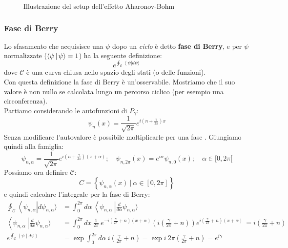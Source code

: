 \documentclass[../../FisicaTeorica.tex]{subfiles}
\begin{document}
\begin{figure}

    \caption{Illustrazione del setup dell'effetto Aharonov-Bohm}
    \label{fig:aharonov_bohm}
\end{figure}%

\subsubsection{Fase di Berry}
Lo sfasamento che acquisisce una $\psi$ dopo un \textit{ciclo} è detto \textbf{fase di Berry}, e per $\psi$ normalizzate ($\Braket{\psi|\psi} = 1$) ha la seguente definizione:
\[
e^{\oint_{\mathcal{C}}{\left\langle\psi\right|d\psi\rangle\ }}
\]
dove $\mathcal{C}$ è una curva chiusa nello spazio degli stati (o delle funzioni).\\
Con questa definizione la fase di Berry è un'osservabile. Mostriamo che il suo valore è non nullo se calcolata lungo un percorso ciclico (per esempio una circonferenza).\\
Partiamo considerando le autofunzioni di $P_\gamma$:
\[
\psi_n\left(x\right)=\frac{1}{\sqrt{2\pi}}e^{i\left(n+\frac{\gamma}{2\pi}\right)x}
\]
Senza modificare l'autovalore è possibile moltiplicarle per una fase .
Giungiamo quindi alla famiglia:
\[
\psi_{n,\alpha}=\frac{1}{\sqrt{2\pi}}e^{i\left(n+\frac{\gamma}{2\pi}\right)\left(x+\alpha\right)}; \quad \psi_{n,2\pi}(x) = e^{i\alpha}\psi_{n,0}(x); \quad \alpha \in [0,2\pi [
\]
Possiamo ora definire $\mathcal{C}$:
\[
C=\left \{ \psi_{n,\alpha}\left(x\right)\>|\>  \alpha \in [0,2\pi] \right \}
\]
e quindi calcolare l'integrale per la fase di Berry:
\begin{align*}
\oint_{\mathcal{C}}{\left\langle\psi_{n,\alpha}\right|d\psi_{n,\alpha}\rangle}&=\int_{0}^{2\pi}{d\alpha\ \left\langle\psi_{n,\alpha}\ \right|\frac{d}{d\alpha}\psi_{n,\alpha}\rangle\ }\\
\left\langle\psi_{n,\alpha}\ \right|\frac{d}{dx}\psi_{n,\alpha} \rangle &=\int_{0}^{2\pi}{dx\ \frac{1}{2\pi}\ e^{-i\left(\frac{\gamma}{2\pi}+n\right)\left(x+\alpha\right)}\left(i\left(\frac{\gamma}{2\pi}+n\right)\right)e^{i\left(\frac{\gamma}{2\pi}+n\right)\left(x+\alpha\right)\ }}=i\left(\frac{\gamma}{2\pi}+n\right)\\
e^{\oint_{\mathcal{C}}\left\langle\psi\middle| d\psi\right\rangle}&=\exp{\int_{0}^{2\pi}{d\alpha\ i\left(\frac{\gamma}{2\pi}+n\right)}}=\exp{i\ 2\pi\left(\frac{\gamma}{2\pi}+n\right)}=e^{i\gamma} 
\end{align*}
\end{document}

